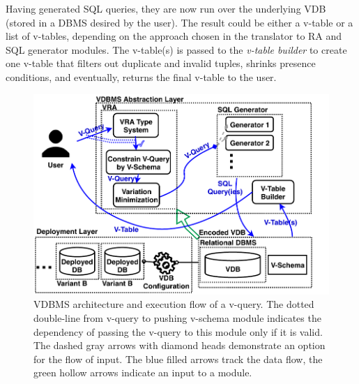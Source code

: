 Having generated SQL queries, they are now run over the underlying 
VDB (stored in a DBMS desired by the user). The result could be either 
a v-table or a list of v-tables, depending on the approach chosen in 
the translator to RA and SQL generator modules. The v-table(s) is passed
to the \emph{v-table builder}
to create one v-table that filters out 
duplicate and invalid tuples, shrinks presence conditions, and 
eventually, returns the final v-table to the user.

\begin{figure}
\includegraphics[width = \linewidth] {figs/arch7.pdf}
\caption{VDBMS architecture and execution flow of a v-query. 
The dotted double-line from v-query to pushing v-schema module
indicates the dependency of passing the v-query to this module
only if it is valid. 
The dashed gray arrows with diamond heads demonstrate
an option for the flow of input. 
The blue filled arrows track the data flow, the green hollow arrows 
indicate an input to a module.}
\label{fig:arch}
\end{figure}


